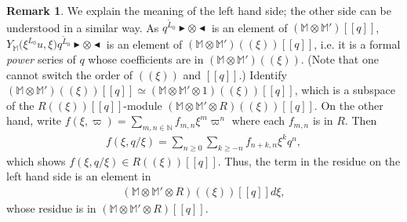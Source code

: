 \documentclass[12pt,a4paper,notitlepage]{article}
\theoremstyle{definition}
\newtheorem{rem}[df]{Remark}
\theoremstyle{plain}
\newcommand{\wtd}{\widetilde}
\newcommand{\Mbb}{\mathbb M}
\newcommand{\Nbb}{\mathbb N}
\newcommand{\btl}{\blacktriangleleft}
\newcommand{\btr}{\blacktriangleright}
\numberwithin{equation}{section}
\begin{document}
\begin{rem}\label{lb33}
	We  explain the meaning of the left hand side; the other side can be understood in a similar way. As   $q^{\wtd L_0}\btr\otimes\btl$ is an element of $(\Mbb\otimes\Mbb')[[q]]$, $Y_{\Mbb}\big(\xi^{L_0}u,\xi\big)q^{\wtd L_0}\btr\otimes\btl$ is an element of $(\Mbb\otimes\Mbb')((\xi))[[q]]$, i.e. it is a formal \emph{power} series of $q$ whose coefficients are in $(\Mbb\otimes\Mbb')((\xi))$. (Note that one cannot switch the order of $((\xi))$ and $[[q]]$.) Identify $(\Mbb\otimes\Mbb')((\xi))[[q]]\simeq (\Mbb\otimes\Mbb'\otimes 1)((\xi))[[q]]$, which is a subspace of the $R((\xi))[[q]]$-module $(\Mbb\otimes\Mbb'\otimes R)((\xi))[[q]]$.  On the other hand,  write $f(\xi,\varpi)=\sum_{m,n\in\Nbb}f_{m,n}\xi^m\varpi^n$ where each $f_{m,n}$ is in $R$. Then
	\begin{align*}
	f(\xi,q/\xi)=\sum_{n\geq 0}\sum_{k\geq -n}f_{n+k,n}\xi^k q^n,
	\end{align*}
	which shows $f(\xi,q/\xi)\in R((\xi))[[q]]$. Thus, the term in the residue on the left hand side is an element in
	\begin{align*}
	(\Mbb\otimes\Mbb'\otimes R)((\xi))[[q]]d\xi,
	\end{align*}
	whose residue is in $(\Mbb\otimes\Mbb'\otimes R)[[q]]$.
\end{rem}
\end{document}
